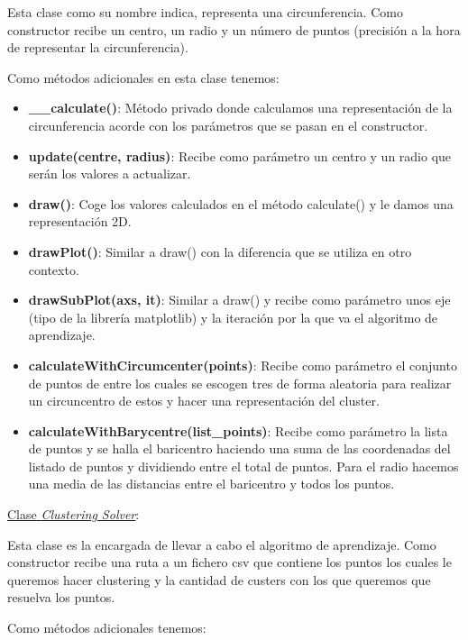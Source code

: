 \documentclass[conference,a4paper]{IEEEtran}
\begin{document}
Esta clase como su nombre indica, representa una circunferencia. Como constructor recibe un centro, un radio y un número de puntos (precisión a la hora de representar la circunferencia).

Como métodos adicionales en esta clase tenemos:

\begin{itemize}

	\item{\textbf{\_\_calculate()}: Método privado donde calculamos una representación de la circunferencia acorde con los parámetros que se pasan en el constructor.}
	\item{\textbf{update(centre, radius)}: Recibe como parámetro un centro y un radio que serán los valores a actualizar.}
	\item{\textbf{draw()}: Coge los valores calculados en el método calculate() y le damos una representación 2D. }
	\item{\textbf{drawPlot()}: Similar a draw() con la diferencia que se utiliza en otro contexto.}
	\item{\textbf{drawSubPlot(axs, it)}: Similar a draw() y recibe como parámetro unos eje (tipo de la librería matplotlib) y la iteración por la que va el algoritmo de aprendizaje.}
	\item{\textbf{calculateWithCircumcenter(points)}: Recibe como parámetro el conjunto de puntos de entre los cuales se escogen tres de forma aleatoria para realizar un circuncentro de estos y hacer una representación del cluster.}
	\item{\textbf{calculateWithBarycentre(list\_points)}: Recibe como parámetro la lista de puntos y se halla el baricentro haciendo una suma de las coordenadas del listado de puntos y dividiendo entre el total de puntos.  Para el radio hacemos una media de las distancias entre el baricentro y todos los puntos.}

\end{itemize}

\underline{Clase \textit{Clustering Solver}}:

Esta clase es la encargada de llevar a cabo el algoritmo de aprendizaje. Como constructor recibe una ruta a un fichero csv que contiene los puntos los cuales le queremos hacer clustering y la cantidad de custers con los que queremos que resuelva los puntos.

Como métodos adicionales tenemos:
\end{document}

